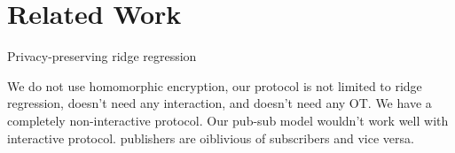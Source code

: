 \section{Related Work}
\label{sec:related}

Privacy-preserving ridge regression

We do not use homomorphic encryption, our protocol is not limited to ridge
regression, doesn't need any interaction, and doesn't need any OT. We have a
completely non-interactive protocol. Our pub-sub model wouldn't work well
with interactive protocol. publishers are oiblivious of subscribers and vice
versa.

